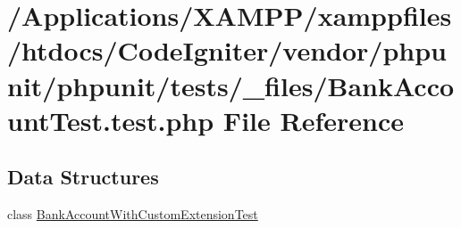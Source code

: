 \hypertarget{_bank_account_test_8test_8php}{}\section{/\+Applications/\+X\+A\+M\+P\+P/xamppfiles/htdocs/\+Code\+Igniter/vendor/phpunit/phpunit/tests/\+\_\+files/\+Bank\+Account\+Test.test.\+php File Reference}
\label{_bank_account_test_8test_8php}
\subsection*{Data Structures}
\begin{DoxyCompactItemize}
\item 
class \mbox{\hyperlink{class_bank_account_with_custom_extension_test}{Bank\+Account\+With\+Custom\+Extension\+Test}}
\end{DoxyCompactItemize}

